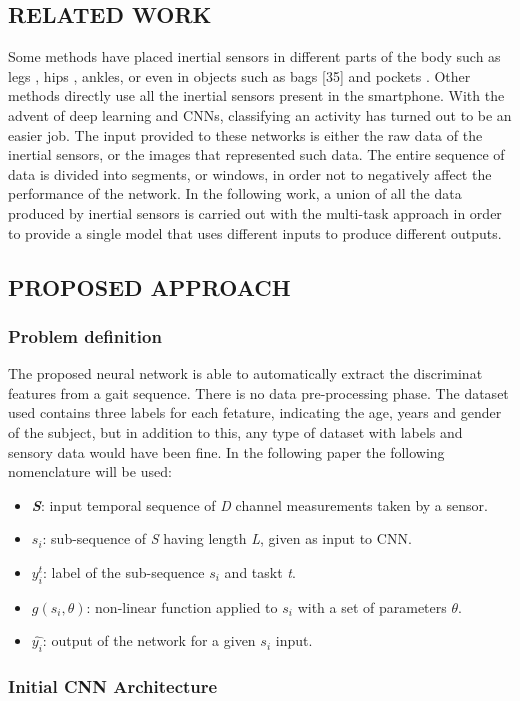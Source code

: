 \subsection{RELATED WORK}
Some methods have placed inertial sensors in different parts of the body 
such as legs \cite{0857651733}, hips \cite{0857651732}, ankles, or even in objects such as bags [35] and 
pockets \cite{0857651720}. Other methods \cite{0857651736} directly use all the inertial sensors present 
in the smartphone. With the advent of deep learning and CNNs, classifying 
an activity has turned out to be an easier job. The input provided to these 
networks is either the raw data of the inertial sensors, or the images that 
represented such data. The entire sequence of data is divided into segments, 
or windows, in order not to negatively affect the performance of the network. 
In the following work, a union of all the data produced by inertial sensors is 
carried out with the multi-task approach in order to provide a single model 
that uses different inputs to produce different outputs.

\subsection{PROPOSED APPROACH}
\subsubsection{Problem definition}
The proposed neural network is able to automatically extract the discriminat 
features from a gait sequence. There is no data pre-processing phase. The 
dataset used contains three labels for each fetature, indicating the age, years 
and gender of the subject, but in addition to this, any type of dataset with 
labels and sensory data would have been fine. In the following paper the 
following nomenclature will be used:
\begin{itemize}
    \item {\bfseries{\emph{S}}}: input temporal sequence of \emph{D} channel measurements taken by a sensor.
    \item {\bfseries{$ s_i $}}: sub-sequence of \emph{S} having length \emph{L}, given as input to CNN.
    \item $ y_i^t $: label of the sub-sequence $ s_i $ and taskt \emph{t}.
    \item $ g(s_i, \theta ) $: non-linear function applied to $ s_i $ with a set of parameters $ \theta $.
    \item {\bfseries{$ \hat{y_i} $}}: output of the network for a given $ s_i $ input.
\end{itemize}

\subsubsection{Initial CNN Architecture}
